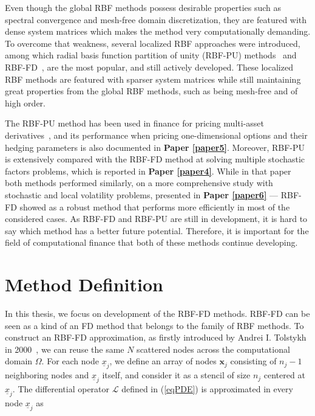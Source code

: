 \documentclass{UUThesisTemplate}
\begin{document}
\par
Even though the global RBF methods possess desirable properties such as spectral convergence and mesh-free domain discretization, they are featured with dense system matrices which makes the method very computationally demanding. To overcome that weakness, several localized RBF approaches were introduced, among which radial basis function partition of unity (RBF-PU) methods~\cite{wendland2002fast} and RBF-FD~\cite{tolstykh2000using, wright2006scattered}, are the most popular, and still actively developed. These localized RBF methods are featured with sparser system matrices while still maintaining great properties from the global RBF methods, such as being mesh-free and of high order.

\par
The RBF-PU method has been used in finance for pricing multi-asset derivatives~\cite{safdari2015radial, shcherbakov2016radialvanilla, shcherbakov2016radial}, and its performance when pricing one-dimensional options and their hedging parameters is also documented in \textbf{Paper \ref{paper5}}. Moreover, RBF-PU is extensively compared with the RBF-FD method at solving multiple stochastic factors problems, which is reported in \textbf{Paper \ref{paper4}}. While in that paper both methods performed similarly, on a more comprehensive study with stochastic and local volatility problems, presented in \textbf{Paper \ref{paper6}} --- RBF-FD showed as a robust method that performs more efficiently in most of the considered cases. As RBF-FD and RBF-PU are still in development, it is hard to say which method has a better future potential. Therefore, it is important for the field of computational finance that both of these methods continue developing.
%





%
\section{Method Definition}

\par
In this thesis, we focus on development of the RBF-FD methods. RBF-FD can be seen as a kind of an FD method that belongs to the family of RBF methods. To construct an RBF-FD approximation, as firstly introduced by Andrei I. Tolstykh in 2000~\cite{tolstykh2000using}, we can reuse the same $N$ scattered nodes across the computational domain $\Omega$. For each node $\underline{x}_j$, we define an array of nodes $\mathbf{x}_j$ consisting of $n_j-1$ neighboring nodes and $\underline{x}_j$ itself, and consider it as a stencil of size $n_j$ centered at $\underline{x}_j$. The differential operator $\mathcal{L}$ defined in (\ref{eqPDE})  is approximated in every node  $\underline{x}_j$ as
\end{document}
